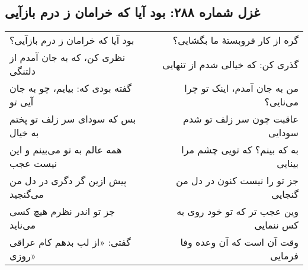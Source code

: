 \begin{center}
\section*{غزل شماره ۲۸۸: بود آیا که خرامان ز درم بازآیی}
\label{sec:288}
\begin{longtable}{l p{0.5cm} r}
بود آیا که خرامان ز درم بازآیی؟
&&
گره از کار فروبستهٔ ما بگشایی؟
\\
نظری کن، که به جان آمدم از دلتنگی
&&
گذری کن: که خیالی شدم از تنهایی
\\
گفته بودی که: بیایم، چو به جان آیی تو
&&
من به جان آمدم، اینک تو چرا می‌نایی؟
\\
بس که سودای سر زلف تو پختم به خیال
&&
عاقبت چون سر زلف تو شدم سودایی
\\
همه عالم به تو می‌بینم و این نیست عجب
&&
به که بینم؟ که تویی چشم مرا بینایی
\\
پیش ازین گر دگری در دل من می‌گنجید
&&
جز تو را نیست کنون در دل من گنجایی
\\
جز تو اندر نظرم هیچ کسی می‌ناید
&&
وین عجب تر که تو خود روی به کس ننمایی
\\
گفتی: «از لب بدهم کام عراقی روزی»
&&
وقت آن است که آن وعده وفا فرمایی
\\
\end{longtable}
\end{center}
